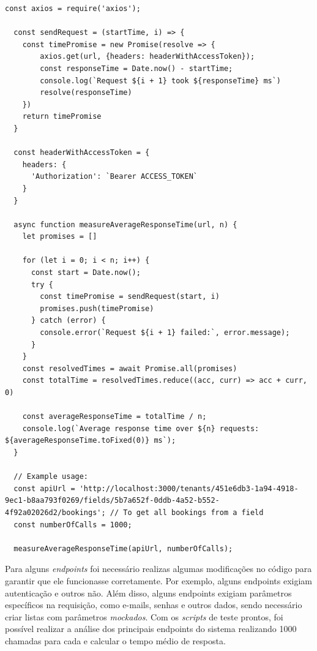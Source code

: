 \begin{lstlisting}[caption={\textit{script} para cálculo do tempo médio de resposta.},label={cod:script_tempo_medio_resposta}]
  const axios = require('axios');

  const sendRequest = (startTime, i) => {
    const timePromise = new Promise(resolve => {
        axios.get(url, {headers: headerWithAccessToken});
        const responseTime = Date.now() - startTime;
        console.log(`Request ${i + 1} took ${responseTime} ms`)
        resolve(responseTime)
    })
    return timePromise
  }

  const headerWithAccessToken = {
    headers: {
      'Authorization': `Bearer ACCESS_TOKEN`
    }
  }
  
  async function measureAverageResponseTime(url, n) {
    let promises = []
  
    for (let i = 0; i < n; i++) {
      const start = Date.now();
      try {
        const timePromise = sendRequest(start, i)
        promises.push(timePromise)
      } catch (error) {
        console.error(`Request ${i + 1} failed:`, error.message);
      }
    }
    const resolvedTimes = await Promise.all(promises)
    const totalTime = resolvedTimes.reduce((acc, curr) => acc + curr, 0)

    const averageResponseTime = totalTime / n;
    console.log(`Average response time over ${n} requests: ${averageResponseTime.toFixed(0)} ms`);
  }
  
  // Example usage:
  const apiUrl = 'http://localhost:3000/tenants/451e6db3-1a94-4918-9ec1-b8aa793f0269/fields/5b7a652f-0ddb-4a52-b552-4f92a02026d2/bookings'; // To get all bookings from a field
  const numberOfCalls = 1000;
  
  measureAverageResponseTime(apiUrl, numberOfCalls);
\end{lstlisting}

Para alguns \textit{endpoints} foi necessário realizas algumas modificações no código para garantir que ele funcionasse corretamente. Por exemplo, alguns endpoints exigiam autenticação e outros não. Além disso, alguns endpoints exigiam parâmetros específicos na requisição, como e-mails, senhas e outros dados, sendo necessário criar listas com parâmetros \textit{mockados}. Com os \textit{scripts} de teste prontos, foi possível realizar a análise dos principais endpoints do sistema realizando 1000 chamadas para cada e calcular o tempo médio de resposta.


